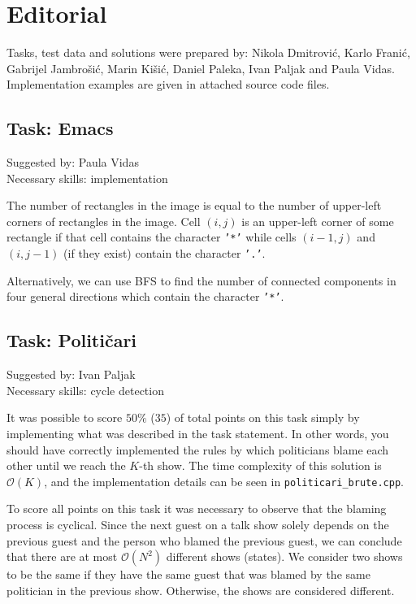 \documentclass[a4paper]{article}
\begin{document}
\section*{Editorial}

Tasks, test data and solutions were prepared by: Nikola Dmitrović, Karlo
Franić, Gabrijel Jambrošić, Marin Kišić, Daniel Paleka, Ivan Paljak and Paula
Vidas. Implementation examples are given in attached source code files.

\subsection*{Task: Emacs}
\textsf{Suggested by: Paula Vidas}\\
\textsf{Necessary skills: implementation}

The number of rectangles in the image is equal to the number of upper-left
corners of rectangles in the image. Cell $(i, j)$ is an upper-left corner of
some rectangle if that cell contains the character \texttt{'*'} while cells $(i
- 1, j)$ and $(i, j - 1)$ (if they exist) contain the character \texttt{'.'}.

Alternatively, we can use BFS to find the number of connected components in four
general directions which contain the character \texttt{'*'}.

\subsection*{Task: Političari}
\textsf{Suggested by: Ivan Paljak}\\
\textsf{Necessary skills: cycle detection}

It was possible to score $50\%$ ($35$) of total points on this task
simply by implementing what was described in the task statement. In other
words, you should have correctly implemented the rules by which politicians
blame each other until we reach the $K$-th show. The time complexity of this
solution is $\mathcal{O}(K)$, and the implementation details can be seen
in \texttt{politicari\_brute.cpp}.

To score all points on this task it was necessary to observe that the blaming
process is cyclical. Since the next guest on a talk show solely depends on the
previous guest and the person who blamed the previous guest, we can conclude
that there are at most $\mathcal{O}(N^2)$ different shows (states). We consider
two shows to be the same if they have the same guest that was blamed by the
same politician in the previous show. Otherwise, the shows are considered
different.
\end{document}
